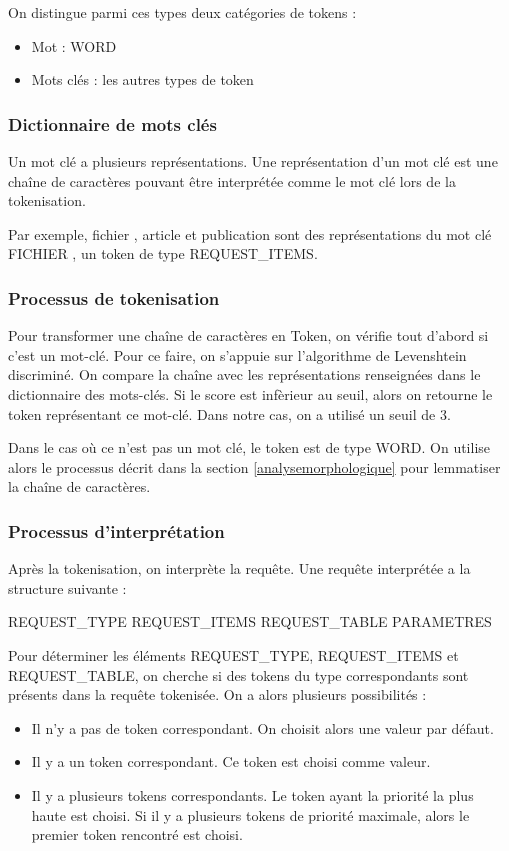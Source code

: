 \documentclass[a4paper]{elsarticle}
\begin{document}
On distingue parmi ces types deux catégories de tokens :
\begin{itemize}
\item Mot : WORD
\item Mots clés : les autres types de token
\end{itemize}

\subsubsection{Dictionnaire de mots clés}

Un mot clé a plusieurs représentations. Une représentation d'un mot clé est une chaîne de caractères pouvant être interprétée comme le mot clé lors de la tokenisation.

Par exemple, \og fichier \fg{}, \og article \fg{} et \og publication \fg{} sont des représentations du mot clé \og FICHIER \fg{}, un token de type REQUEST\_ITEMS.

\subsubsection{Processus de tokenisation}

Pour transformer une chaîne de caractères en Token, on vérifie tout d'abord si c'est un mot-clé. Pour ce faire, on s'appuie sur l'algorithme de Levenshtein discriminé. On compare la chaîne avec les représentations renseignées dans le dictionnaire des mots-clés. Si le score est infèrieur au seuil, alors on retourne le token représentant ce mot-clé. Dans notre cas, on a utilisé un seuil de $3$.

Dans le cas où ce n'est pas un mot clé, le token est de type WORD. On utilise alors le processus décrit dans la section \ref{analysemorphologique} pour lemmatiser la chaîne de caractères.

\subsubsection{Processus d'interprétation}

Après la tokenisation, on interprète la requête. Une requête interprétée a la structure suivante :

\begin{center}
REQUEST\_TYPE REQUEST\_ITEMS REQUEST\_TABLE PARAMETRES
\end{center}

Pour déterminer les éléments REQUEST\_TYPE, REQUEST\_ITEMS et REQUEST\_TABLE, on cherche si des tokens du type correspondants sont présents dans la requête tokenisée. On a alors plusieurs possibilités :
\begin{itemize}
\item Il n'y a pas de token correspondant. On choisit alors une valeur par défaut.
\item Il y a un token correspondant. Ce token est choisi comme valeur.
\item Il y a plusieurs tokens correspondants. Le token ayant la priorité la plus haute est choisi. Si il y a plusieurs tokens de priorité maximale, alors le premier token rencontré est choisi.
\end{itemize}
\end{document}
